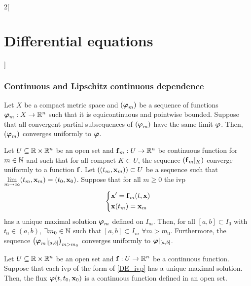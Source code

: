 \documentclass[../../../main.tex]{subfiles}
\begin{document}
\begin{multicols}{2}[\section{Differential equations}]
  \subsubsection{Continuous and Lipschitz continuous dependence}
  \begin{lemma}
    Let $X$ be a compact metric space and $(\boldsymbol{\mathrm{\varphi}}_m)$ be a sequence of functions $\boldsymbol{\mathrm{\varphi}}_m:X\rightarrow\mathbb{R}^n$ such that it is equicontinuous and pointwise bounded. Suppose that all convergent partial subsequences of $(\boldsymbol{\mathrm{\varphi}}_m)$ have the same limit $\boldsymbol{\mathrm{\varphi}}$. Then, $(\boldsymbol{\mathrm{\varphi}}_m)$ converges uniformly to $\boldsymbol{\mathrm{\varphi}}$.
  \end{lemma}
  \begin{prop}
    Let $U\subseteq\mathbb{R}\times\mathbb{R}^n$ be an open set and $\boldsymbol{\mathrm{f}}_m:U\rightarrow\mathbb{R}^n$ be continuous function for $m\in\mathbb{N}$ and such that for all compact $K\subset U$, the sequence $(\boldsymbol{\mathrm{f}}_m|_K)$ converge uniformly to a function $\boldsymbol{\mathrm{f}}$. Let $((t_m,\boldsymbol{\mathrm{x}}_m))\subset U$ be a sequence such that $\displaystyle\lim_{m\to\infty}(t_m,\boldsymbol{\mathrm{x}}_m)=(t_0,\boldsymbol{\mathrm{x}}_0)$. Suppose that for all $m\geq 0$ the ivp
    \begin{equation*}
      \left\{
      \begin{aligned}
         & \boldsymbol{\mathrm{x}}'      =\boldsymbol{\mathrm{f}}_m(t,\boldsymbol{\mathrm{x}}) \\
         & \boldsymbol{\mathrm{x}}(t_m)  =\boldsymbol{\mathrm{x}}_m
      \end{aligned}
      \right.
    \end{equation*}
    has a unique maximal solution $\boldsymbol{\mathrm{\varphi}}_m$ defined on $I_m$. Then, for all $[a,b]\subset I_0$ with $t_0\in(a,b)$, $\exists m_0\in\mathbb{N}$ such that $[a,b]\subset I_m$ $\forall m>m_0$. Furthermore, the sequence $\left(\boldsymbol{\mathrm{\varphi}}_m|_{[a,b]}\right)_{m>m_0}$ converges uniformly to $\boldsymbol{\mathrm{\varphi}}|_{[a,b]}$.
  \end{prop}
  \begin{theorem}
    Let $U\subseteq\mathbb{R}\times\mathbb{R}^n$ be an open set and $\boldsymbol{\mathrm{f}}:U\rightarrow\mathbb{R}^n$ be a continuous function. Suppose that each ivp of the form of \eqref{DE_ivp} has a unique maximal solution. Then, the flux $\boldsymbol{\mathrm{\varphi}}(t,t_0,\boldsymbol{\mathrm{x}}_0)$ is a continuous function defined in an open set.
  \end{theorem}
  \begin{theorem}

\end{theorem}
\end{multicols}
\end{document}
